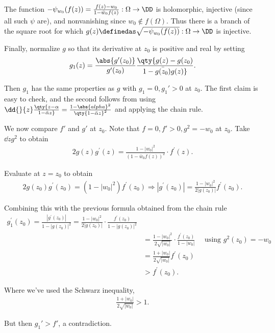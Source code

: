 \begin{description}
The function
\(-\psi_{w_0}(f(z)) = {f(z) - w_0 \over 1 - \bar w_0 f(z)}: \Omega \to \DD\)
is holomorphic, injective (since all such \(\psi\) are), and
nonvanishing since \(w_0 \not\in f(\Omega)\). Thus there is a branch of
the square root for which
\(g(z) \definedas \sqrt{-\psi_{w_0}(f(z))}: \Omega \to \DD\) is
injective.

Finally, normalize \(g\) so that its derivative at \(z_0\) is positive
and real by setting \begin{align*}
g_1(z) = { \abs{g'(z_0)} \over g'(z_0)} \qty{g(z) - g(z_0) \over 1 - \bar{g(z_0)} g(z) }
.\end{align*}

Then \(g_1\) has the same properties as \(g\) with \(g_1 = 0, g_1' > 0\)
at \(z_0\). The first claim is easy to check, and the second follows
from using
\(\dd{}{z} \qty{z - \alpha \over 1 - \bar \alpha z} = {1 - \abs{alpha}^2 \over \qty{1 - \bar \alpha z}^2 }\)
and applying the chain rule.

We now compare \(f'\) and \(g'\) at \(z_0\). Note that
\(f = 0, f' > 0, g^2 = -w_0\) at \(z_0\). Take \(\dd{}{z} g^2\) to
obtain \begin{align*}
2 g(z) g^{\prime}(z)=\frac{1-\left|w_{0}\right|^{2}}{\left(1-\bar{w}_{0} f(z)\right)^{2}} \cdot f^{\prime}(z)
.\end{align*}

Evaluate at \(z=z_0\) to obtain \begin{align*}
2 g\left(z_{0}\right) g^{\prime}\left(z_{0}\right)=\left(1-\left|w_{0}\right|^{2}\right) f^{\prime}\left(z_{0}\right) \Rightarrow\left|g^{\prime}\left(z_{0}\right)\right|=\frac{1-\left|w_{0}\right|^{2}}{2\left|g\left(z_{0}\right)\right|} f^{\prime}\left(z_{0}\right)
.\end{align*}

Combining this with the previous formula obtained from the chain rule
\begin{align*}
g_{1}^{\prime}\left(z_{0}\right)=\frac{\left|g^{\prime}\left(z_{0}\right)\right|}{1-\left|g\left(z_{0}\right)\right|^{2}}=\frac{1-\left|w_{0}\right|^{2}}{2\left|g\left(z_{0}\right)\right|} \cdot \frac{f^{\prime}\left(z_{0}\right)}{1-\left|g\left(z_{0}\right)\right|^{2}} \\
&=\frac{1-\left|w_{0}\right|^{2}}{2 \sqrt{\left|w_{0}\right|}} \cdot \frac{f^{\prime}\left(z_{0}\right)}{1-\left|w_{0}\right|} \quad \text{ using } g^2(z_0) = - w_0 \\
&=\frac{1+\left|w_{0}\right|}{2 \sqrt{\left|w_{0}\right|}} f^{\prime}\left(z_{0}\right) \\
& > f^{\prime}\left(z_{0}\right)
.\end{align*}

Where we've used the Schwarz inequality, \begin{align*}
\frac{1+\left|w_{0}\right|}{2 \sqrt{\left|w_{0}\right|}}>1
.\end{align*}

But then \(g_1' > f'\), a contradiction.
\end{description}


